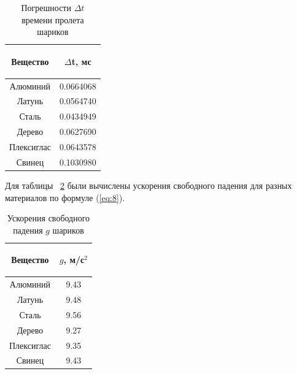\begin{center}
\begin{table}[H]
\centering
\caption{Погрешности $\Delta t$ времени пролета шариков}
\label{tabl:3}
\renewcommand{\arraystretch}{1.15}
\begin{tabular}{|c|c|}
\hline
\begin{minipage}{5cm}
\begin{center}
    Вещество 
\end{center}
\end{minipage} & 
\begin{minipage}{5cm}
\begin{center}
    $\Delta$t, мс 
\end{center}
\end{minipage} \\
\hline
Алюминий   & 0.0664068 \\
Латунь     & 0.0564740 \\
Сталь      & 0.0434949 \\
Дерево     & 0.0627690 \\
Плексиглас & 0.0643578 \\
Свинец     & 0.1030980 \\
\hline
\end{tabular}
\end{table}
\end{center}

Для таблицы ~\ref{tabl:4} были вычислены ускорения свободного падения для разных материалов по формуле (\ref{eq:8}).

\begin{center}
\begin{table}[H]
\centering
\caption{Ускорения свободного падения $g$ шариков}
\label{tabl:4}
\renewcommand{\arraystretch}{1.15}
\begin{tabular}{|c|c|}
\hline
\begin{minipage}{5cm}
\begin{center}
    Вещество 
\end{center}
\end{minipage} & 
\begin{minipage}{5cm}
\begin{center}
    $g$, м/с$^2$ 
\end{center}
\end{minipage} \\
\hline
Алюминий   & 9.43 \\
Латунь     & 9.48 \\
Сталь      & 9.56 \\
Дерево     & 9.27 \\
Плексиглас & 9.35 \\
Свинец     & 9.43 \\
\hline
\end{tabular}
\end{table}
\end{center}

